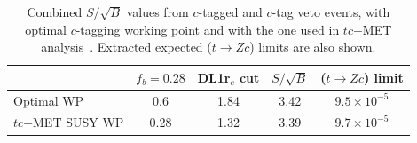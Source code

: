 \begin{table}[!htbp]
	\small
	\centering
	\begin{tabular}{l|cc|cc}
		\toprule
		& $f_b=0.28$ & DL1r$_c$ cut & $S/\sqrt{B}$ & \BR($t\to Zc$) limit  \\
		\midrule
		Optimal WP & 0.6 & 1.84 & 3.42 & $9.5\times 10^{-5}$ \\
		$tc$+MET SUSY WP & 0.28 & 1.32 & 3.39 & $9.7\times 10^{-5}$ \\
		\bottomrule
	\end{tabular}
	\label{app:DL1rc:tab:WPs}
	\caption{
		\small{
		Combined $S/\sqrt{B}$ values from $c$-tagged and $c$-tag veto events, with optimal $c$-tagging working point and with the one used in $tc$+MET analysis~\cite{ANA-SUSY-2019-23}.
		Extracted expected \BR($t\to Zc$) limits are also shown. %
	}}%
\end{table}

